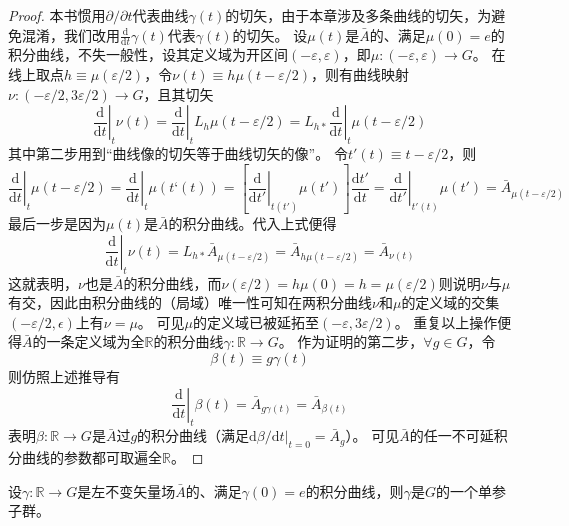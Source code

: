 \begin{proof}
    本书惯用$\partial / \partial t$代表曲线$\gamma(t)$的切矢，由于本章涉及多条曲线的切矢，为避免混淆，我们改用$\frac{\mathrm{d}}{\mathrm{d}t}\gamma(t)$代表$\gamma(t)$的切矢。
    设$\mu(t)$是$\bar A$的、满足$\mu(0) = e$的积分曲线，不失一般性，设其定义域为开区间$(-\varepsilon, \varepsilon)$，即$\mu \colon (-\varepsilon, \varepsilon) \to G$。
    在线上取点$h \equiv \mu(\varepsilon / 2)$，令$\nu(t) \equiv h\mu(t - \varepsilon / 2)$，则有曲线映射$\nu \colon (-\varepsilon / 2, 3\varepsilon / 2) \to G$，且其切矢
    $$\left.\frac{\mathrm{d}}{\mathrm{d}t}\right|_t\nu(t) = \left.\frac{\mathrm{d}}{\mathrm{d}t}\right|_tL_h\mu(t - \varepsilon / 2) = L_{h*}\left.\frac{\mathrm{d}}{\mathrm{d}t}\right|_t\mu(t - \varepsilon / 2)$$
    其中第二步用到``曲线像的切矢等于曲线切矢的像''。
    令$t'(t) \equiv t - \varepsilon / 2$，则
    $$\left.\frac{\mathrm{d}}{\mathrm{d}t}\right|_t\mu(t - \varepsilon / 2) = \left.\frac{\mathrm{d}}{\mathrm{d}t}\right|_t\mu(t‘(t)) = \left[\left.\frac{\mathrm{d}}{\mathrm{d}t'}\right|_{t(t')}\mu(t')\right]\frac{\mathrm{d}t'}{\mathrm{d}t} = \left.\frac{\mathrm{d}}{\mathrm{d}t'}\right|_{t'(t)}\mu(t') = \bar A_{\mu(t - \varepsilon / 2)}$$
    最后一步是因为$\mu(t)$是$\bar A$的积分曲线。代入上式便得
    $$\left.\frac{\mathrm{d}}{\mathrm{d}t}\right|_t\nu(t) = L_{h*}\bar A_{\mu(t - \varepsilon / 2)} = \bar A_{h\mu(t - \varepsilon / 2)} = \bar A_{\nu(t)}$$
    这就表明，$\nu$也是$\bar A$的积分曲线，而$\nu(\varepsilon / 2) = h\mu(0) = h = \mu(\varepsilon / 2)$则说明$\nu$与$\mu$有交，因此由积分曲线的（局域）唯一性可知在两积分曲线$\nu$和$\mu$的定义域的交集$(-\varepsilon / 2, \epsilon)$上有$\nu = \mu$。
    可见$\mu$的定义域已被延拓至$(-\varepsilon, 3\varepsilon / 2)$。
    重复以上操作便得$\bar A$的一条定义域为全$\mathbb{R}$的积分曲线$\gamma \colon \mathbb{R} \to G$。
    作为证明的第二步，$\forall g \in G$，令
    $$\beta(t) \equiv g\gamma(t)$$
    则仿照上述推导有
    $$\left.\frac{\mathrm{d}}{\mathrm{d}t}\right|_t\beta(t) = \bar A_{g\gamma(t)} = \bar A_{\beta(t)}$$
    表明$\beta \colon \mathbb{R} \to G$是$\bar A$过$g$的积分曲线（满足$\mathrm{d}\beta / \mathrm{d}t|_{t = 0} = \bar A_g$）。
    可见$\bar A$的任一不可延积分曲线的参数都可取遍全$\mathbb{R}$。
\end{proof}

\begin{theorem}
    设$\gamma \colon \mathbb{R} \to G$是左不变矢量场$\bar A$的、满足$\gamma(0) = e$的积分曲线，则$\gamma$是$G$的一个单参子群。
\end{theorem}

